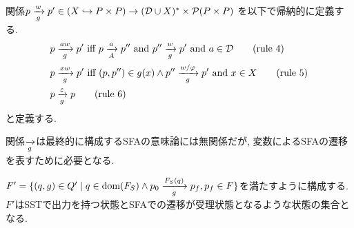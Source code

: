 \documentclass[uplatex,dvipdfmx,a4j]{jsreport}
\begin{document}
  関係$p \transarrow{w}{g} p'\in (X \hookrightarrow P \times P)
  \rightarrow (\mathcal{D} \cup X)^* \times \mathcal{P}(P \times P)$
  を以下で帰納的に定義する.
  \setcounter{equation}{0}
  \begin{align}
    p &\transarrow{aw}{g} p' \
      \mbox{iff} \
        p \transarrow{a}{A} p'' \
      \mbox{and} \
        p'' \transarrow{w}{g} p' \
      \mbox{and} \
        a \in \mathcal{D} \tag{\mbox{rule 4}} \label{rule: 4} \\
    p &\transarrow{xw}{g} p' \
      \mbox{iff} \
        (p, p'') \in g(x) \land p'' \transarrow{w / \varphi}{g} p' \
      \mbox{and} \
        x \in X \tag{\mbox{rule 5}} \label{rule: 5} \\
    p &\transarrow{\varepsilon}{g} p \tag{\mbox{rule 6}} \label{rule: 6}
  \end{align}
  と定義する.

  関係$\transarrow{}{g}$は最終的に構成するSFAの意味論には無関係だが, 変数によるSFAの遷移を表すために必要となる.

  $F' = \{ (q, g) \in Q' \mid q \in \dom(F_S) \land
  p_0 \transarrow{F_S(q)}{g} p_f, p_f \in F \}$を満たすように構成する.
  $F'$はSSTで出力を持つ状態とSFAでの遷移が受理状態となるような状態の集合となる.
\end{document}
